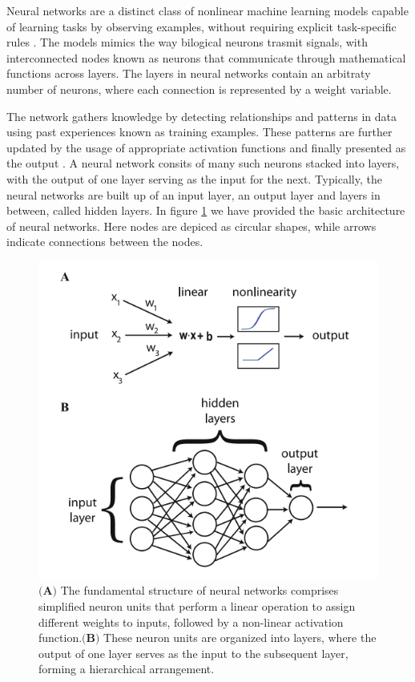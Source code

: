 \documentclass[a4paper, UKenglish, 11pt]{uiomaster}
\begin{document}
Neural networks are a distinct class of nonlinear machine learning models capable of learning tasks by observing examples, without requiring explicit task-specific rules \cite{Hjorth-Jensen2022}. The models mimics the way bilogical neurons trasmit signals, with interconnected nodes known as neurons that communicate through mathematical functions across layers. The layers in neural networks contain an arbitraty number of neurons, where each connection is represented by a weight variable.

The network gathers knowledge by detecting relationships and patterns in data using past experiences known as training examples. These patterns are further updated by the usage of appropriate activation functions and finally presented as the output \cite{nwankpa2018activation}. A neural network consits of many such neurons stacked into layers, with the output of one layer serving as the input for the next. Typically, the neural networks are built up of an input layer, an output layer and layers in between, called hidden layers. In figure \ref{fig:NN_basic_architecture} we have provided the basic architecture of neural networks. Here nodes are depiced as circular shapes, while arrows indicate connections between the nodes.

\begin{figure}
    \centering
    \includegraphics[width=\linewidth]{figures/basic_architecture.png}
    \caption{$\textbf{(A)}$ The fundamental structure of neural networks comprises simplified neuron units that perform a linear operation to assign different weights to inputs, followed by a non-linear activation function.$\textbf{(B)}$ These neuron units are organized into layers, where the output of one layer serves as the input to the subsequent layer, forming a hierarchical arrangement.}
    \label{fig:NN_basic_architecture}
\end{figure}
\end{document}
